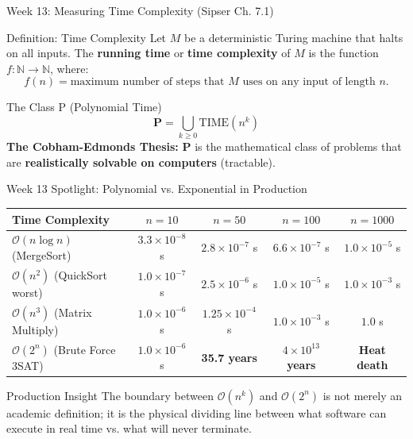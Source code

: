 \documentclass[aspectratio=169,10pt]{beamer}
\begin{document}
\begin{frame}{Week 13: Measuring Time Complexity (Sipser Ch. 7.1)}
    \begin{block}{Definition: Time Complexity}
        Let $M$ be a deterministic Turing machine that halts on all inputs. The \textbf{running time} or \textbf{time complexity} of $M$ is the function $f: \mathbb{N} \to \mathbb{N}$, where:
        $$f(n) = \text{maximum number of steps that } M \text{ uses on any input of length } n.$$
    \end{block}
    
    \begin{exampleblock}{The Class P (Polynomial Time)}
        $$\mathbf{P} = \bigcup_{k \ge 0} \text{TIME}(n^k)$$
        \textbf{The Cobham-Edmonds Thesis:} $\mathbf{P}$ is the mathematical class of problems that are \textbf{realistically solvable on computers} (tractable).
    \end{exampleblock}
\end{frame}

\begin{frame}{Week 13 Spotlight: Polynomial vs. Exponential in Production}
    \begin{center}
    \small
    \begin{tabular}{lcccc}
        \toprule
        \textbf{Time Complexity} & \textbf{$n = 10$} & \textbf{$n = 50$} & \textbf{$n = 100$} & \textbf{$n = 1000$} \\
        \midrule
        $\mathcal{O}(n \log n)$ (MergeSort) & $3.3 \times 10^{-8}$ s & $2.8 \times 10^{-7}$ s & $6.6 \times 10^{-7}$ s & $1.0 \times 10^{-5}$ s \\
        $\mathcal{O}(n^2)$ (QuickSort worst) & $1.0 \times 10^{-7}$ s & $2.5 \times 10^{-6}$ s & $1.0 \times 10^{-5}$ s & $1.0 \times 10^{-3}$ s \\
        $\mathcal{O}(n^3)$ (Matrix Multiply) & $1.0 \times 10^{-6}$ s & $1.25 \times 10^{-4}$ s & $1.0 \times 10^{-3}$ s & $1.0$ s \\
        \midrule
        \rowcolor{red!15}
        $\mathcal{O}(2^n)$ (Brute Force 3SAT) & $1.0 \times 10^{-6}$ s & \textbf{35.7 years} & \textbf{$4 \times 10^{13}$ years} & \textbf{Heat death} \\
        \bottomrule
    \end{tabular}
    \end{center}
    \vspace{0.1cm}
    \begin{alertblock}{Production Insight}
        The boundary between $\mathcal{O}(n^k)$ and $\mathcal{O}(2^n)$ is not merely an academic definition; it is the physical dividing line between what software can execute in real time vs. what will never terminate.
    \end{alertblock}
\end{frame}
\end{document}

